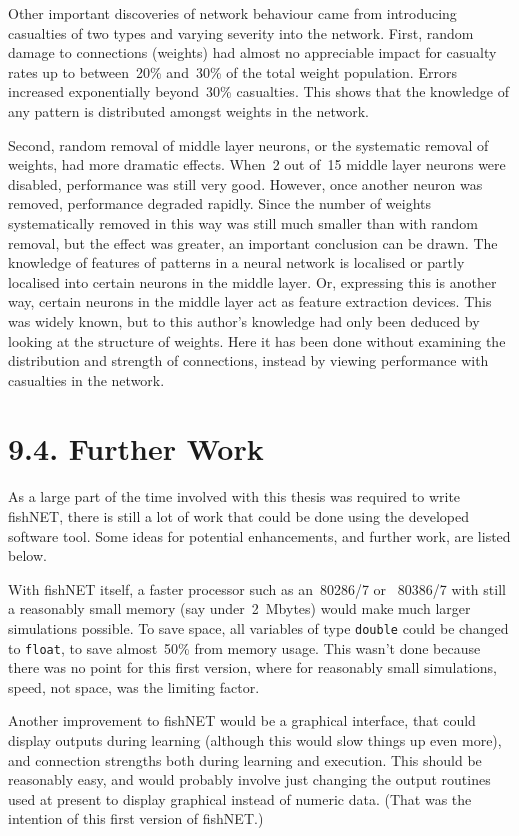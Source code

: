 \documentclass[12pt]{report}
\begin{document}
Other important discoveries of network behaviour came from
introducing casualties of two types and varying severity into the
network.
First, random damage to connections (weights) had almost no
appreciable impact for casualty rates up to between~20\% and~30\% 
of the total weight population.
Errors increased exponentially beyond~30\% casualties.
This shows that the knowledge of any pattern is distributed amongst
weights in the network.

Second, random removal of middle layer neurons, or the systematic
removal of weights, had more dramatic effects.
When~2 out of~15 middle layer neurons were disabled, performance was
still very good.
However, once another neuron was removed, performance degraded
rapidly.
Since the number of weights systematically removed in this way was
still much smaller than with random removal, but the effect was
greater, an important conclusion can be drawn.
The knowledge of features of patterns in a neural network is localised or
partly localised into certain neurons in the middle layer.
Or, expressing this is another way, certain neurons in the middle
layer act as feature extraction devices.
This was widely known, but to this author's knowledge had only been
deduced by looking at the structure of weights.
Here it has been done without examining the distribution and
strength of connections, instead by viewing performance with
casualties in the network.

\section{9.4. Further Work}

As a large part of the time involved with this thesis was required
to write fishNET, there is still a lot of work that could be done
using the developed software tool.
Some ideas for potential enhancements, and further work, are listed
below.

With fishNET itself, a faster processor such as an~80286/7 or~ 80386/7 
with still a reasonably small memory (say under~2~Mbytes)
would make much larger simulations possible.
To save space, all variables of type \texttt{double} could be changed
to \texttt{float}, to save almost~50\% from memory usage.
This wasn't done because there was no point for this first version, 
where for reasonably small simulations, speed, not space, was the
limiting factor.

Another improvement to fishNET would be a graphical interface, that
could display outputs during learning (although this would slow
things up even more), and connection strengths both during learning
and execution.
This should be reasonably easy, and would probably involve just
changing the output routines used at present to display graphical
instead of numeric data.
(That was the intention of this first version of fishNET.)
\end{document}
